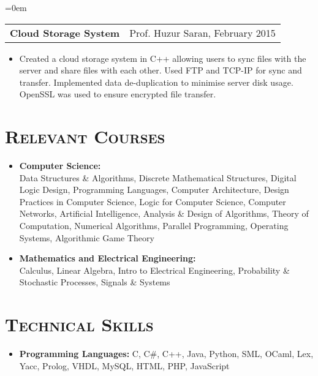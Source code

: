 \documentclass{article}
\makeatletter
\newenvironment{longversion}{}{} %
\newcommand{\headerrow}[2]
{\begin{tabular*}{\linewidth}{l@{\extracolsep{\fill}}r}
	#1 &
	#2 \\
\end{tabular*}}
\newcommand{\tmpsection}[1]{}
\let\tmpsection=\section
\renewcommand{\section}[1]{\tmpsection*{\textsc{#1}}}
\makeatother
\begin{document}
\begin{longversion}
\begin{list} {}{\leftmargin=0em}
\item[]
  \headerrow{ \textbf{Cloud Storage System}} {Prof. Huzur Saran, February 2015}
  \begin{itemize} \item[]
  Created a cloud storage system in C++ allowing users to sync files with the server and share files with each other. Used FTP and TCP-IP for sync and transfer. Implemented data de-duplication to minimise server disk usage. OpenSSL was used to ensure encrypted file transfer.
  \end{itemize}

\end{list}
\end{longversion}

\begin{longversion}
\section{Relevant Courses}
\begin{itemize}
\setlength\itemsep{-1em}
\item \textbf{Computer Science:} \\
Data Structures \& Algorithms, Discrete Mathematical Structures, Digital Logic Design, Programming Languages, Computer Architecture, Design Practices in Computer Science, Logic for Computer Science, Computer Networks, Artificial Intelligence, Analysis \& Design of Algorithms, Theory of Computation, Numerical Algorithms, Parallel Programming, Operating Systems, Algorithmic Game Theory  \\

\item \textbf{Mathematics and Electrical Engineering:} \\
Calculus, Linear Algebra, Intro to Electrical Engineering, Probability \& Stochastic Processes, Signals \& Systems
\end{itemize}
\end{longversion}


\begin{longversion}
\section{Technical Skills}
\begin{itemize}
\item \textbf{Programming Languages:} C, C\#, C++, Java, Python, SML, OCaml, Lex, Yacc, Prolog, VHDL, MySQL, HTML, PHP, JavaScript 

\end{itemize}
\end{longversion}
\end{document}
